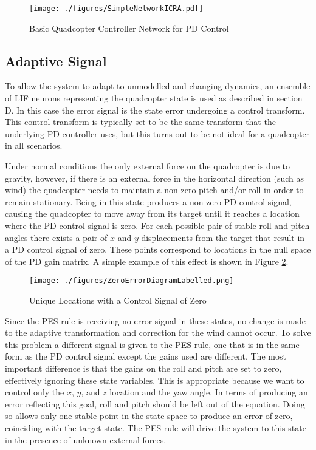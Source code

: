 \documentclass[letterpaper, 10 pt, conference]{ieeeconf}  %
\begin{document}
\begin{figure}
\centering
\texttt{[image: ./figures/SimpleNetworkICRA.pdf]}
\caption{Basic Quadcopter Controller Network for PD Control}
\label{fig:NetBasic}
\end{figure}

\subsection{Adaptive Signal}

To allow the system to adapt to unmodelled and changing dynamics, an ensemble of LIF neurons representing the quadcopter state is used as described in section D.
In this case the error signal is the state error undergoing a control transform.
This control transform is typically set to be the same transform that the underlying PD controller uses, but this turns out to be not ideal for a quadcopter in all scenarios.

Under normal conditions the only external force on the quadcopter is due to gravity, however, if there is an external force in the horizontal direction (such as wind) the quadcopter needs to maintain a non-zero pitch and/or roll in order to remain stationary.
Being in this state produces a non-zero PD control signal, causing the quadcopter to move away from its target until it reaches a location where the PD control signal is zero.
For each possible pair of stable roll and pitch angles there exists a pair of $x$ and $y$ displacements from the target that result in a PD control signal of zero.
These points correspond to locations in the null space of the PD gain matrix.
A simple example of this effect is shown in Figure \ref{fig:zeroError}.

\begin{figure}
\centering
\texttt{[image: ./figures/ZeroErrorDiagramLabelled.png]}
\caption{Unique Locations with a Control Signal of Zero}
\label{fig:zeroError}
\end{figure}

Since the PES rule is receiving no error signal in these states, no change is made to the adaptive transformation and correction for the wind cannot occur.
To solve this problem a different signal is given to the PES rule, one that is in the same form as the PD control signal except the gains used are different.
The most important difference is that the gains on the roll and pitch are set to zero, effectively ignoring these state variables.
This is appropriate because we want to control only the $x$, $y$, and $z$ location and the yaw angle.
In terms of producing an error reflecting this goal, roll and pitch should be left out of the equation.
Doing so allows only one stable point in the state space to produce an error of zero, coinciding with the target state.
The PES rule will drive the system to this state in the presence of unknown external forces.
\end{document}
